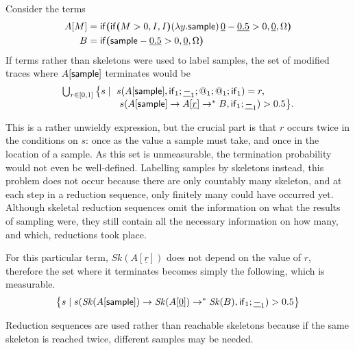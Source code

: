 \begin{example}%
Consider the terms
\begin{align*}
A[M] &= \mathsf{if}\boldsymbol{(}\mathsf{if}\boldsymbol{(}M>0, I, I\boldsymbol{)} (\lambda y.\mathsf{sample})\, \underline 0 - \underline{0.5} > 0, \underline 0, \Omega\boldsymbol{)}\\
B &= \mathsf{if}\boldsymbol{(}\mathsf{sample} - \underline{0.5} > 0, \underline 0, \Omega\boldsymbol{)}
\end{align*}
If terms rather than skeletons were used to label samples, the set of modified traces where $A[\mathsf{sample}]$ terminates would be
\[
\begin{array}{l}
\bigcup_{r \in [0,1]} \big\{s \mid\ s(A[\mathsf{sample}], \mathsf{if}_1;\underline{-}_1;@_1;@_1;\mathsf{if}_1) = r, \\
\qquad\qquad\qquad s(A[\mathsf{sample}] \to A[\underline r] \to^* B, \mathsf{if}_1 ; \underline{-}_1) > 0.5 \big\}.
\end{array}
\]
\iffalse
\lo{The occurrence of $L_s(M)$ in the set comprehension below should be $L_0(M)$?}

\lo{I think we should write ``$[A[\tsample], A[\underline r], \ldots, B$'' in the line above as ``$A[\tsample] \to A[\underline r] \to^\ast B$''; similarly $\mathit{Sk}(A[\tsample]) \to \mathit{Sk}(A[\underline 0]) \to^\ast \mathit{Sk}(B)$ below.}
\fi
This is a rather unwieldy expression, but the crucial part is that $r$ occurs twice in the conditions on $s$: once as the value a sample must take, and once in the location of a sample. 
As this set is unmeasurable, the termination probability would not even be well-defined. 
Labelling samples by skeletons instead, this problem does not occur because there are only countably many skeleton, and at each step in a reduction sequence, only finitely many could have occurred yet. Although skeletal reduction sequences omit the information on what the results of sampling were, they still contain all the necessary information on how many, and which, reductions took place.

For this particular term, $\mathit{Sk}(A[\underline r])$ does not depend on the value of $r$, therefore the set where it terminates becomes simply the following, which is measurable.
\begin{align*}
\big\{s \mid s(\mathit{Sk}(A[\mathsf{sample}]) \to \mathit{Sk}(A[\underline 0]) \to^* \mathit{Sk}(B), \mathsf{if}_1 ; \underline{-}_1) > 0.5 \big\}
\end{align*}
\end{example}

Reduction sequences are used rather than reachable skeletons because if the same skeleton is reached twice, different samples may be needed. 

